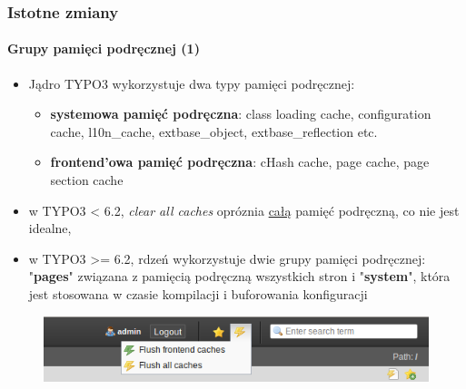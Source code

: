 \begin{frame}[fragile]
	\frametitle{Istotne zmiany}
	\framesubtitle{Grupy pamięci podręcznej (1)}

	\begin{itemize}
		\item Jądro TYPO3 wykorzystuje dwa typy pamięci podręcznej:

			\begin{itemize}
				\item \textbf{systemowa pamięć podręczna}:
				class loading cache, configuration cache, l10n\_cache, extbase\_object, extbase\_reflection etc.
				\item \textbf{frontend'owa pamięć podręczna}:
				cHash cache, page cache, page section cache
			\end{itemize}

		\item w TYPO3 < 6.2, \textit{clear all caches} opróznia \underline{całą} pamięć podręczną, co nie jest idealne,

		\item w TYPO3 >= 6.2, rdzeń wykorzystuje dwie grupy pamięci podręcznej:\newline
			"\textbf{pages}" związana z pamięcią podręczną wszystkich stron i "\textbf{system}", która jest stosowana w czasie kompilacji i buforowania konfiguracji

	\end{itemize}

	\begin{figure}
		\includegraphics[width=0.5\linewidth]{Images/InDepthChanges/CacheGroups.png}
	\end{figure}

\end{frame}


